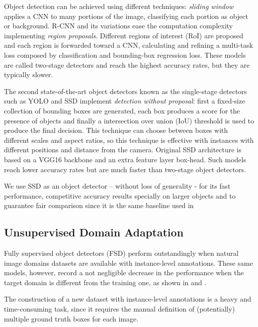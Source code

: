 \documentclass[10pt,twocolumn,letterpaper]{article}
\begin{document}
Object detection can be achieved using different techniques: {\it sliding window} applies a CNN to many portions of the image, classifying each portion as object or background. 
R-CNN and its variations \cite{R-CNN, FastR-CNN, FasterR-CNN} ease the computation complexity implementing {\it region proposals}. Different regions of interest (RoI) are proposed and each region is forwarded toward a CNN, calculating and refining a multi-task loss composed by classification and bounding-box regression loss.
These models are called two-stage detectors and reach the highest accuracy rates, but they are typically slower.

The second state-of-the-art object detectors known as the single-stage detectors such as YOLO and SSD \cite{Yolov2, SSD} implement {\it detection without proposal}: first a  fixed-size collection of bounding boxes are generated, each box produces a score for the presence of objects and finally a intersection over union (IoU) threshold is used to produce the final decision. This technique can choose between boxes with different scales and aspect ratios, so this technique is effective with instances with different positions and distance from the camera.
Original SSD architecture is based on a VGG16 \cite{vgg} backbone and an extra feature layer box-head.
Such models reach lower accuracy rates but are much faster than two-stage object detectors.

 We use SSD as an object detector – without loss of generality - for its fast performance, competitive accuracy results specially on larger objects and to guarantee fair comparison since it is the same baseline used in \cite{CrossDomObjDet}

\subsection{Unsupervised Domain Adaptation}
Fully supervised object detectors (FSD) \cite{R-CNN, FastR-CNN, FasterR-CNN, Yolov2, SSD} perform outstandingly when natural image domains datasets are available with instance-level annotations. These same models, however, record a not negligible decrease in the performance when the target domain is different from the training one, as shown in \cite{BAM} and \cite{CrossDomObjDet}.

The construction of a new dataset with instance-level annotations is a heavy and time-consuming task, since it requires the manual definition of (potentially) multiple ground truth boxes for each image.
\end{document}
